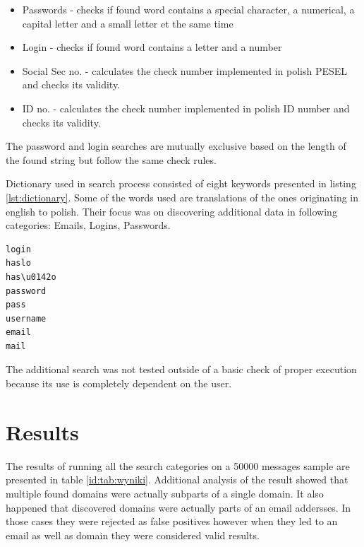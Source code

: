\documentclass[a4paper,twoside,12pt]{book}
\begin{document}
\begin{itemize}
   \item Passwords - checks if found word contains a special character, a numerical, a capital letter and a small letter et the same time
   \item Login - checks if found word contains a letter and a number
   \item Social Sec no. - calculates the check number implemented in polish PESEL and checks its validity.
   \item ID no. - calculates the check number implemented in polish ID number and checks its validity.
\end{itemize}

The password and login searches are mutually exclusive based on the length of the found string but follow the same
check rules.

Dictionary used in search process consisted of eight keywords presented in listing \ref{lst:dictionary}. 
Some of the words used are translations of the ones originating in english to polish. Their focus was on discovering
additional data in following categories: Emails, Logins, Passwords.


\begin{lstlisting}[float=!ht,language=C++,label=lst:dictionary,caption={Testing dictionary.},frame=lines,framexleftmargin=0.5em,captionpos=b,escapechar=^,texcl=true,breaklines=true]
login
haslo
has\u0142o
password
pass
username
email
mail
\end{lstlisting}


The additional search was not tested outside of a basic check of proper execution because its use is completely dependent on the user.

\section{Results}

The results of running all the search categories on a 50000 messages sample are presented in table \ref{id:tab:wyniki}.
Additional analysis of the result showed that multiple found domains were actually subparts of a single
domain. It also happened that discovered domains were actually parts of an email addersses. In those cases
they were rejected as false positives however when they led to an email as well as domain they 
were considered valid results. 
\end{document}
